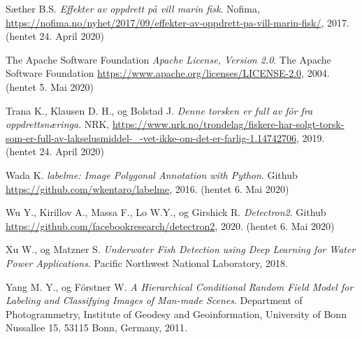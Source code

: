 \documentclass[11ot]{article}
\begin{document}
\begin{thebibliography}{9}
Sæther B.S. 
\textit{Effekter av oppdrett på vill marin fisk}. 
Nofima, \url{https://nofima.no/nyhet/2017/09/effekter-av-oppdrett-pa-vill-marin-fisk/}, 2017. (hentet 24. April 2020)

The Apache Software Foundation 
\textit{Apache License, Version 2.0}. 
The Apache Software Foundation \url{https://www.apache.org/licenses/LICENSE-2.0}, 2004. (hentet 5. Mai 2020)

Trana K., Klausen D. H., og Bolstad J. 
\textit{Denne torsken er full av fôr fra oppdrettsnæringa}. 
NRK, \url{https://www.nrk.no/trondelag/fiskere-har-solgt-torsk-som-er-full-av-lakselusmiddel-_-vet-ikke-om-det-er-farlig-1.14742706}, 2019. (hentet 24. April 2020)

Wada K.
\textit{labelme: Image Polygonal Annotation with Python}. 
Github \url{https://github.com/wkentaro/labelme}, 2016. (hentet 6. Mai 2020)

Wu Y., Kirillov A., Massa F., Lo W.Y., og Girshick R.
\textit{Detectron2}. 
Github \url{https://github.com/facebookresearch/detectron2}, 2020. (hentet 6. Mai 2020)

Xu W., og Matzner S. 
\textit{Underwater Fish Detection using Deep Learning for Water Power Applications}. 
Pacific Northwest National Laboratory, 2018.

Yang M. Y., og Förstner W. 
\textit{A Hierarchical Conditional Random Field Model for Labeling and Classifying Images of Man-made Scenes}. 
Department of Photogrammetry, Institute of Geodesy and Geoinformation, University of Bonn Nussallee 15, 53115 Bonn, Germany, 2011.


\end{thebibliography}

\clearpage
\appendix

%
%
\end{document}
